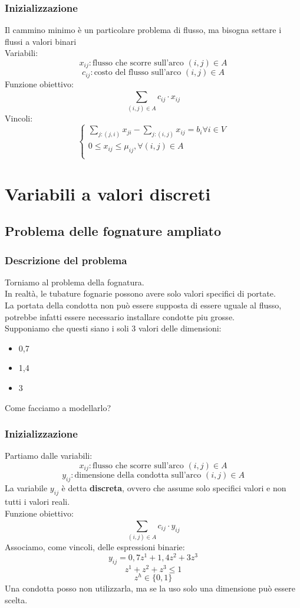 \documentclass[12pt,a4paper]{article}
\let\oldsection\section
\renewcommand{\section}{\clearpage\oldsection}
\begin{document}
\subsubsection{Inizializzazione}
Il cammino minimo è un particolare problema di flusso, ma bisogna settare i flussi a valori binari\\
Variabili:
\[
x_{ij}: \text{flusso che scorre sull'arco } (i,j) \in A
\]
\[
c_{ij}: \text{costo del flusso sull'arco } (i,j) \in A
\]
Funzione obiettivo:
\[
\sum_{(i,j) \in A}^{} c_{ij} \cdot x_{ij}
\]
Vincoli:
\[
\begin{cases}
    \sum_{j:(j,i)}^{} x_{ji} - \sum_{j:(i,j)}^{} x_{ij} = b_{i} \forall i \in V\\
    0 \leq x_{ij} \leq \mu_{ij}, \forall (i,j) \in A\\
    
\end{cases}
\]
\section{Variabili a valori discreti}
\subsection{Problema delle fognature ampliato}
\subsubsection{Descrizione del problema}
Torniamo al problema della fognatura.\\
In realtà, le tubature fognarie possono avere solo valori specifici di portate.\\
La portata della condotta non può essere supposta di essere uguale al flusso, potrebbe infatti essere necessario installare condotte piu grosse.\\
Supponiamo che questi siano i soli 3 valori delle dimensioni:
\begin{itemize}
    \item 0,7
    \item 1,4
    \item 3
\end{itemize}
Come facciamo a modellarlo?
\subsubsection{Inizializzazione}
Partiamo dalle variabili:
\[
x_{ij}: \text{flusso che scorre sull'arco } (i,j) \in A
\]
\[
y_{ij}: \text{dimensione della condotta sull'arco } (i,j) \in A
\]
La variabile $y_{ij}$ è detta \textbf{discreta}, ovvero che assume solo specifici valori e non tutti i valori reali.\\
Funzione obiettivo:
\[
\sum_{(i,j)\in A}^{} c_{ij} \cdot y_{ij}
\]
Associamo, come vincoli, delle espressioni binarie:
\[
y_{ij} = 0,7z^1 + 1,4z^2 + 3z^3
\]
\[
z^1 + z^2 + z^3 \leq 1
\]
\[
z^h \in \{0,1\}
\]
Una condotta posso non utilizzarla, ma se la uso solo una dimensione può essere scelta.
\end{document}
